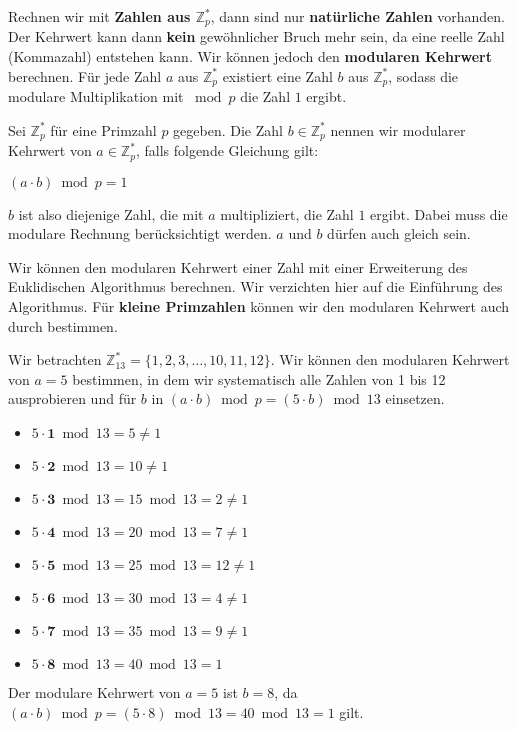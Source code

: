 Rechnen wir mit \textbf{Zahlen aus $\mathbb{Z}_p^*$}, dann sind nur \textbf{natürliche Zahlen} vorhanden. Der Kehrwert kann dann \textbf{kein} gewöhnlicher Bruch mehr sein, da eine reelle Zahl (Kommazahl) entstehen kann. Wir können jedoch den \textbf{modularen Kehrwert} berechnen. Für jede Zahl $a$ aus $\mathbb{Z}_p^*$ existiert eine Zahl $b$ aus $\mathbb{Z}_p^*$, sodass die modulare Multiplikation mit $\bmod p$ die Zahl $1$ ergibt.

\begin{definition}
	Sei $\mathbb{Z}_{p}^*$ für eine Primzahl $p$ gegeben. Die Zahl $b \in \mathbb{Z}_{p}^*$ nennen wir modularer Kehrwert von $a \in \mathbb{Z}_{p}^*$, falls folgende Gleichung gilt:

\begin{center}
$(a \cdot b) \bmod p = 1$
\end{center}
	
$b$ ist also diejenige Zahl, die mit $a$ multipliziert, die Zahl $1$ ergibt. Dabei muss die modulare Rechnung berücksichtigt werden. $a$ und $b$ dürfen auch gleich sein.
\end{definition}

Wir können den modularen Kehrwert einer Zahl mit einer Erweiterung des Euklidischen Algorithmus berechnen. Wir verzichten hier auf die Einführung des Algorithmus. Für \textbf{kleine Primzahlen} können wir den modularen Kehrwert auch durch  bestimmen.

\begin{example}
	Wir betrachten $\mathbb{Z}_{13}^* = \{1, 2, 3, \dots, 10, 11, 12\}$. Wir können den modularen Kehrwert von $a = 5$ bestimmen, in dem wir systematisch alle Zahlen von \num{1} bis \num{12} ausprobieren und für $b$ in $(a \cdot b) \bmod p = (5 \cdot b) \bmod 13$ einsetzen. 

\begin{multicols}{2}
	\begin{itemize}
		\item $5 \cdot \textbf{1} \bmod 13 = 5 \neq 1$
		\item $5 \cdot \textbf{2} \bmod 13 = 10 \neq 1$
		\item $5 \cdot \textbf{3} \bmod 13 = 15 \bmod 13 = 2 \neq 1$
		\item $5 \cdot \textbf{4} \bmod 13 = 20 \bmod 13 = 7 \neq 1$
		\item $5 \cdot \textbf{5} \bmod 13 = 25 \bmod 13 = 12 \neq 1$
		\item $5 \cdot \textbf{6} \bmod 13 = 30 \bmod 13 = 4 \neq 1$
		\item $5 \cdot \textbf{7} \bmod 13 = 35 \bmod 13 = 9 \neq 1$
		\item $5 \cdot \textbf{8} \bmod 13 = 40 \bmod 13 = 1$ \checkmark
	\end{itemize}
\end{multicols}
	
Der modulare Kehrwert von $a = 5$ ist $b = 8$, da $(a \cdot b) \bmod p = (5 \cdot 8) \bmod 13 = 40 \bmod 13 = 1$ gilt.
	
\end{example}

